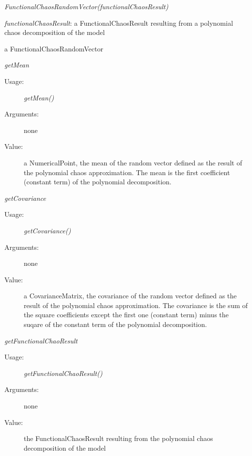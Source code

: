 \begin{description}

\item[Usage:]   \textit{FunctionalChaosRandomVector(functionalChaosResult)}

\item[Arguments:]  \textit{functionalChaosResult}: a FunctionalChaosResult resulting from a polynomial chaos decomposition of the model


\item[Value:]  a FunctionalChaosRandomVector


\item[Some methods :]  \rule{0pt}{1em}
\begin{description}


\item \textit{getMean}
\begin{description}
\item[Usage:] \textit{getMean()}
\item[Arguments:] none
\item[Value:] a NumericalPoint, the mean of the random vector defined as the result of the polynomial chaos approximation. The mean is the first coefficient (constant term) of the polynomial decomposition.
\end{description}
\bigskip

\item \textit{getCovariance}
\begin{description}
\item[Usage:] \textit{getCovariance()}
\item[Arguments:] none
\item[Value:] a CovarianceMatrix, the covariance of the random vector defined as the result of the polynomial chaos approximation. The covariance is the sum of the square coefficients except the first one (constant term) minus the suqare of the constant term of the polynomial decomposition.
\end{description}
\bigskip

\item \textit{getFunctionalChaoResult}
\begin{description}
\item[Usage:] \textit{getFunctionalChaoResult()}
\item[Arguments:] none
\item[Value:] the FunctionalChaosResult resulting from the polynomial chaos decomposition of the model
\end{description}
\bigskip


\end{description}
\end{description}
